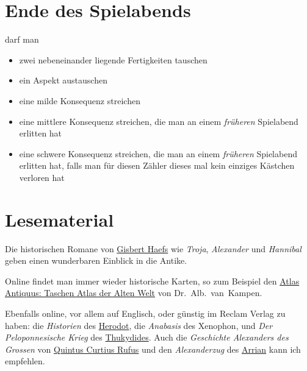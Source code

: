\documentclass{tufte-handout}
\begin{document}
\clearpage


\section{Ende des Spielabends}


 darf man

\begin{itemize}
\item zwei nebeneinander liegende Fertigkeiten tauschen
\item ein Aspekt austauschen
\item eine milde Konsequenz streichen
\item eine mittlere Konsequenz streichen, die man an einem \textit{früheren}
  Spielabend erlitten hat
\item eine schwere Konsequenz streichen, die man an einem
  \textit{früheren} Spielabend erlitten hat, falls man für diesen
  Zähler dieses mal kein einziges Kästchen verloren hat
\end{itemize}

\section{Lesematerial}

Die historischen Romane von
\href{http://de.wikipedia.org/wiki/Gisbert_Haefs}{Gisbert Haefs} wie
\textit{Troja}, \emph{Alexander} und \emph{Hannibal} geben einen
wunderbaren Einblick in die Antike.

Online findet man immer wieder historische Karten, so zum Beispiel den
\href{http://archive.org/details/AtlasAntiquus}{Atlas Antiquus:
  Taschen Atlas der Alten Welt} von Dr.~Alb.~van~Kampen.

Ebenfalls online, vor allem auf Englisch, oder günstig im Reclam
Verlag zu haben: die \emph{Historien} des
\href{http://de.wikipedia.org/wiki/Herodot}{Herodot}, die
\emph{Anabasis} des Xenophon, und \emph{Der Peloponnesische Krieg} des
\href{http://de.wikipedia.org/wiki/Thukydides}{Thukydides}. Auch die
\emph{Geschichte Alexanders des Grossen} von
\href{http://de.wikipedia.org/wiki/Quintus_Curtius_Rufus_%28Historiker%29}{Quintus
  Curtius Rufus} und den \emph{Alexanderzug} des
\href{http://de.wikipedia.org/wiki/Arrian}{Arrian} kann ich empfehlen.
\end{document}
